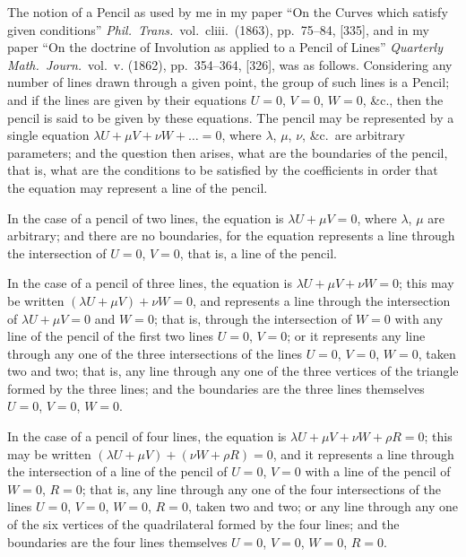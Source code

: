 \documentclass[11pt,a4paper]{article}
\theoremstyle{definition}
\begin{document}
\vspace{0.5em}

The notion of a Pencil as used by me in my paper ``On the Curves which satisfy
given conditions'' \textit{Phil.\ Trans.}\ vol.\ cliii.\ (1863), pp.~75--84, [335], and in my paper ``On
the doctrine of Involution as applied to a Pencil of Lines'' \textit{Quarterly Math.\ Journ.}\ vol.~v.
(1862), pp.~354--364, [326], was as follows. Considering any number of lines drawn
through a given point, the group of such lines is a Pencil; and if the lines are given by
their equations $U = 0$, $V = 0$, $W = 0$, \&c., then the pencil is said to be given by these
equations. The pencil may be represented by a single equation $\lambda U + \mu V + \nu W + \ldots = 0$,
where $\lambda$, $\mu$, $\nu$, \&c.\ are arbitrary parameters; and the question then arises, what are
the boundaries of the pencil, that is, what are the conditions to be satisfied by the
coefficients in order that the equation may represent a line of the pencil.

In the case of a pencil of two lines, the equation is $\lambda U + \mu V = 0$, where $\lambda$, $\mu$ are
arbitrary; and there are no boundaries, for the equation represents a line through the
intersection of $U = 0$, $V = 0$, that is, a line of the pencil.

In the case of a pencil of three lines, the equation is $\lambda U + \mu V + \nu W = 0$; this may
be written $(\lambda U + \mu V) + \nu W = 0$, and represents a line through the intersection of
$\lambda U + \mu V = 0$ and $W = 0$; that is, through the intersection of $W = 0$ with any line of the
pencil of the first two lines $U = 0$, $V = 0$; or it represents any line through any one of the
three intersections of the lines $U = 0$, $V = 0$, $W = 0$, taken two and two; that is, any line
through any one of the three vertices of the triangle formed by the three lines; and the
boundaries are the three lines themselves $U = 0$, $V = 0$, $W = 0$.

In the case of a pencil of four lines, the equation is $\lambda U + \mu V + \nu W + \rho R = 0$;
this may be written $(\lambda U + \mu V) + (\nu W + \rho R) = 0$, and it represents a line through
the intersection of a line of the pencil of $U = 0$, $V = 0$ with a line of the pencil of
$W = 0$, $R = 0$; that is, any line through any one of the four intersections of the lines
$U = 0$, $V = 0$, $W = 0$, $R = 0$, taken two and two; or any line through any one of the six
vertices of the quadrilateral formed by the four lines; and the boundaries are the four
lines themselves $U = 0$, $V = 0$, $W = 0$, $R = 0$.
\end{document}
